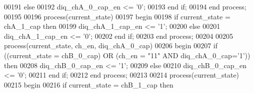 \begin{DoxyCode}
00191    \textcolor{keywordflow}{else} 
00192       \textcolor{vhdlchar}{diq_chA_0_cap_en} \textcolor{vhdlchar}{<=} \textcolor{vhdlchar}{'}\textcolor{vhdllogic}{}\textcolor{vhdllogic}{0}\textcolor{vhdlchar}{'};
00193    \textcolor{keywordflow}{end} \textcolor{keywordflow}{if};
00194 \textcolor{keywordflow}{end} \textcolor{keywordflow}{process};
00195 
00196 \textcolor{keywordflow}{process}(current_state)
00197 \textcolor{vhdlkeyword}{begin }
00198    \textcolor{keywordflow}{if} \textcolor{vhdlchar}{current_state} \textcolor{vhdlchar}{=} \textcolor{vhdlchar}{chA\_1\_cap} \textcolor{keywordflow}{then} 
00199       \textcolor{vhdlchar}{diq_chA_1_cap_en} \textcolor{vhdlchar}{<=} \textcolor{vhdlchar}{'}\textcolor{vhdllogic}{}\textcolor{vhdllogic}{1}\textcolor{vhdlchar}{'};
00200    \textcolor{keywordflow}{else} 
00201       \textcolor{vhdlchar}{diq_chA_1_cap_en} \textcolor{vhdlchar}{<=} \textcolor{vhdlchar}{'}\textcolor{vhdllogic}{}\textcolor{vhdllogic}{0}\textcolor{vhdlchar}{'};
00202    \textcolor{keywordflow}{end} \textcolor{keywordflow}{if};
00203 \textcolor{keywordflow}{end} \textcolor{keywordflow}{process};
00204 
00205 \textcolor{keywordflow}{process}(current_state, ch_en, diq_chA_0_cap)
00206 \textcolor{vhdlkeyword}{begin }
00207    \textcolor{keywordflow}{if} \textcolor{vhdlchar}{(}\textcolor{vhdlchar}{(}\textcolor{vhdlchar}{current_state} \textcolor{vhdlchar}{=} \textcolor{vhdlchar}{chB\_0\_cap}\textcolor{vhdlchar}{)} \textcolor{keywordflow}{OR} \textcolor{vhdlchar}{(}\textcolor{vhdlchar}{ch_en} \textcolor{vhdlchar}{=} \textcolor{vhdllogic}{"11"} \textcolor{keywordflow}{AND} \textcolor{vhdlchar}{diq_chA_0_cap}\textcolor{vhdlchar}{=}\textcolor{vhdlchar}{'}\textcolor{vhdllogic}{}\textcolor{vhdllogic}{1}\textcolor{vhdlchar}{'}\textcolor{vhdlchar}{)}\textcolor{vhdlchar}{)} \textcolor{keywordflow}{then} 
00208       \textcolor{vhdlchar}{diq_chB_0_cap_en} \textcolor{vhdlchar}{<=} \textcolor{vhdlchar}{'}\textcolor{vhdllogic}{}\textcolor{vhdllogic}{1}\textcolor{vhdlchar}{'};
00209    \textcolor{keywordflow}{else} 
00210       \textcolor{vhdlchar}{diq_chB_0_cap_en} \textcolor{vhdlchar}{<=} \textcolor{vhdlchar}{'}\textcolor{vhdllogic}{}\textcolor{vhdllogic}{0}\textcolor{vhdlchar}{'};
00211    \textcolor{keywordflow}{end} \textcolor{keywordflow}{if};
00212 \textcolor{keywordflow}{end} \textcolor{keywordflow}{process};
00213 
00214 \textcolor{keywordflow}{process}(current_state)
00215 \textcolor{vhdlkeyword}{begin }
00216    \textcolor{keywordflow}{if} \textcolor{vhdlchar}{current_state} \textcolor{vhdlchar}{=} \textcolor{vhdlchar}{chB\_1\_cap} \textcolor{keywordflow}{then} 

\end{DoxyCode}
